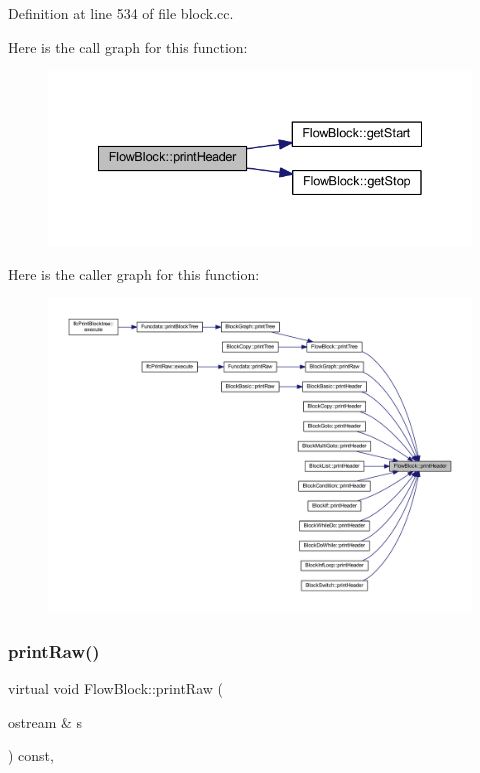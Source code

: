 Definition at line 534 of file block.\+cc.

Here is the call graph for this function\+:
\nopagebreak
\begin{figure}[H]
\begin{center}
\leavevmode
\includegraphics[width=335pt]{class_flow_block_a0d19c5b80186cf289dfbe0ce9e3ce37a_cgraph}
\end{center}
\end{figure}
Here is the caller graph for this function\+:
\nopagebreak
\begin{figure}[H]
\begin{center}
\leavevmode
\includegraphics[width=350pt]{class_flow_block_a0d19c5b80186cf289dfbe0ce9e3ce37a_icgraph}
\end{center}
\end{figure}
\mbox{\label{class_flow_block_aa5bd09d25026872141e42118b03119b1}} 
\subsubsection{\texorpdfstring{printRaw()}{printRaw()}}
{\footnotesize\ttfamily virtual void Flow\+Block\+::print\+Raw (\begin{DoxyParamCaption}\item[{ostream \&}]{s }\end{DoxyParamCaption}) const\hspace{0.3cm}{\ttfamily [inline]}, {\ttfamily [virtual]}}



